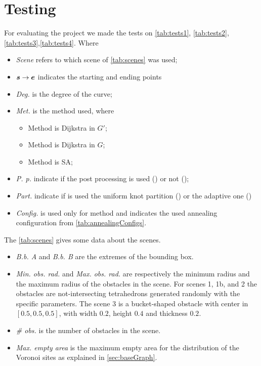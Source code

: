 \documentclass[dissertation.tex]{subfiles}
\begin{document}
\chapter{Testing}\label{cha:testing}
For evaluating the project we made the tests on
\cref{tab:tests1}, \cref{tab:tests2}, \cref{tab:tests3},\cref{tab:tests4}.
Where
\begin{itemize}
\item \emph{Scene} refers to which scene of \cref{tab:scenes} was used;
\item $\boldsymbol{s}\rightarrow\boldsymbol{e}$ indicates the starting and ending points
\item \emph{Deg.} is the degree of the \bs curve;
\item \emph{Met.} is the method used, where
  \begin{itemize}
  \item Method \metA is Dijkstra in $G'$;
  \item Method \metB is Dijkstra in $G$;
  \item Method \metC is \acl{SA};
  \end{itemize}
\item \emph{P. p.} indicate if the post processing is used (\ypp) or
  not (\npp);
\item \emph{Part.} indicate if is used the uniform knot partition
  (\ukp) or the adaptive one (\akp)
\item \emph{Config.} is used only for method \metC and indicates the
  used annealing configuration from \cref{tab:annealingConfigs}.
\end{itemize}

The \cref{tab:scenes} gives some data about the scenes.
\begin{itemize}
\item \emph{B.b. A} and \emph{B.b. B} are the extremes of the bounding
  box.
\item \emph{Min. obs. rad.} and \emph{Max. obs. rad.} are respectively
  the minimum radius and the maximum radius of the obstacles in the
  scene. For scenes 1, 1b, and 2 the obstacles are not-intersecting
  tetrahedrons generated randomly with the specific parameters. The
  scene 3 is a bucket-shaped obstacle with center in $[0.5,0.5,0.5]$,
  with width $0.2$, height $0.4$ and thickness $0.2$.
\item \emph{\# obs.} is the number of obstacles in the scene.
\item \emph{Max. empty area} is the maximum empty area for the
  distribution of the Voronoi sites as explained in \cref{sec:baseGraph}.
\end{itemize}
\end{document}
